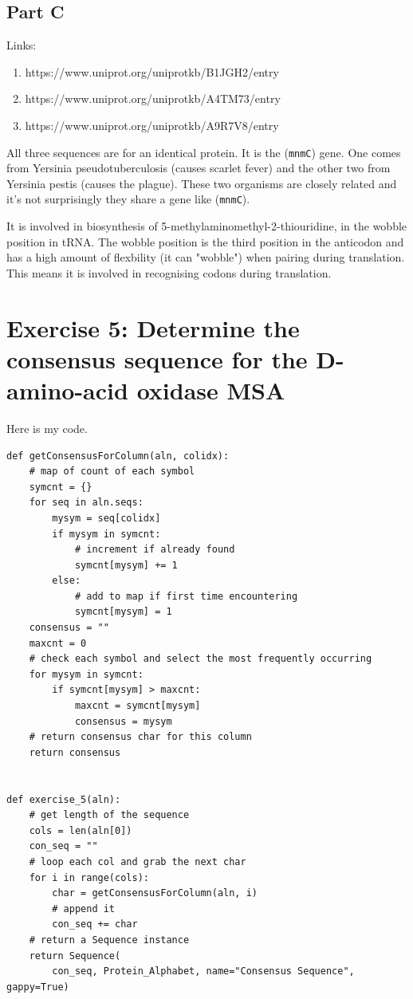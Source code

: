 \documentclass{article} %
\begin{document}
\subsection{Part C}

Links:

\begin{enumerate}
    \item https://www.uniprot.org/uniprotkb/B1JGH2/entry
    \item https://www.uniprot.org/uniprotkb/A4TM73/entry
    \item https://www.uniprot.org/uniprotkb/A9R7V8/entry
\end{enumerate}

All three sequences are for an identical protein. It is the (\verb+mnmC+) gene. One comes from Yersinia pseudotuberculosis (causes scarlet fever) and the other two from Yersinia pestis (causes the plague). These two organisms are closely related and it's not surprisingly they share a gene like (\verb+mnmC+).

It is involved in biosynthesis of 5-methylaminomethyl-2-thiouridine, in the wobble position in tRNA. The wobble position is the third position in the anticodon and has a high amount of flexbility (it can "wobble") when pairing during translation. This means it is involved in recognising codons during translation.

\section{Exercise 5: Determine the consensus sequence for the D-amino-acid oxidase MSA}

Here is my code.

\begin{verbatim}
def getConsensusForColumn(aln, colidx):
    # map of count of each symbol
    symcnt = {}
    for seq in aln.seqs:
        mysym = seq[colidx]
        if mysym in symcnt:
            # increment if already found
            symcnt[mysym] += 1
        else:
            # add to map if first time encountering
            symcnt[mysym] = 1
    consensus = ""
    maxcnt = 0
    # check each symbol and select the most frequently occurring
    for mysym in symcnt:
        if symcnt[mysym] > maxcnt:
            maxcnt = symcnt[mysym]
            consensus = mysym
    # return consensus char for this column
    return consensus


def exercise_5(aln):
    # get length of the sequence
    cols = len(aln[0])
    con_seq = ""
    # loop each col and grab the next char
    for i in range(cols):
        char = getConsensusForColumn(aln, i)
        # append it
        con_seq += char
    # return a Sequence instance
    return Sequence(
        con_seq, Protein_Alphabet, name="Consensus Sequence", gappy=True)

\end{verbatim}
\end{document}
